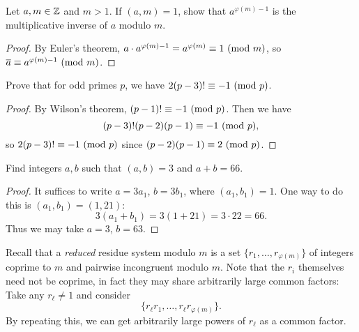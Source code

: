 \begin{exercise}
  Let $a, m \in \mathbb{Z}$ and $m > 1$.
  If $(a, m) = 1$, show that
  $a^{\varphi(m) - 1}$ is the multiplicative
  inverse of $a$ modulo $m$.
\end{exercise}

\begin{proof}
  By Euler's theorem,
  $a \cdot a^{\varphi(m) - 1} = a^{\varphi(m)} \equiv 1 \ (\mathrm{mod}\ m)$,
  so $\overline{a} \equiv a^{\varphi(m) - 1} \ (\mathrm{mod}\ m)$.
\end{proof}

\begin{exercise}
  Prove that for odd primes $p$, we
  have $2(p - 3)! \equiv -1 \ (\mathrm{mod}\ p)$.
\end{exercise}

\begin{proof}
  By Wilson's theorem, 
  $(p - 1)! \equiv -1 \ (\mathrm{mod}\ p)$. Then we
  have
  \[
    (p - 3)! (p - 2)(p - 1)
    \equiv -1 \ (\mathrm{mod}\ p),
  \]
  so $2(p - 3)! \equiv -1 \ (\mathrm{mod}\ p)$ since
  $(p - 2)(p - 1) \equiv 2 \ (\mathrm{mod}\ p)$.
\end{proof}

\begin{exercise}
  Find integers $a, b$ such that
  $(a, b) = 3$ and $a + b = 66$.
\end{exercise}

\begin{proof}
  It suffices to write
  $a = 3a_1$, $b = 3b_1$, where
  $(a_1, b_1) = 1$. One way to do this
  is $(a_1, b_1) = (1, 21)$:
  \[
    3(a_1 + b_1) = 3(1 + 21)
    = 3 \cdot 22 = 66.
  \]
  Thus we may take
  $a = 3$, $b = 63$.
\end{proof}

\begin{remark}
  Recall that a \emph{reduced} 
  residue system modulo $m$
  is a set $\{r_1, \dots, r_{\varphi(m)}\}$
  of integers coprime to $m$ and
  pairwise incongruent modulo $m$.
  Note that the $r_i$ themselves need
  not be coprime, in fact they may
  share arbitrarily large common factors:
  Take any $r_\ell \ne 1$ and consider
  \[
    \{r_\ell r_1, \dots, r_{\ell} r_{\varphi(m)}\}.
  \]
  By repeating this, we can get
  arbitrarily large powers of $r_\ell$
  as a common factor.
\end{remark}
